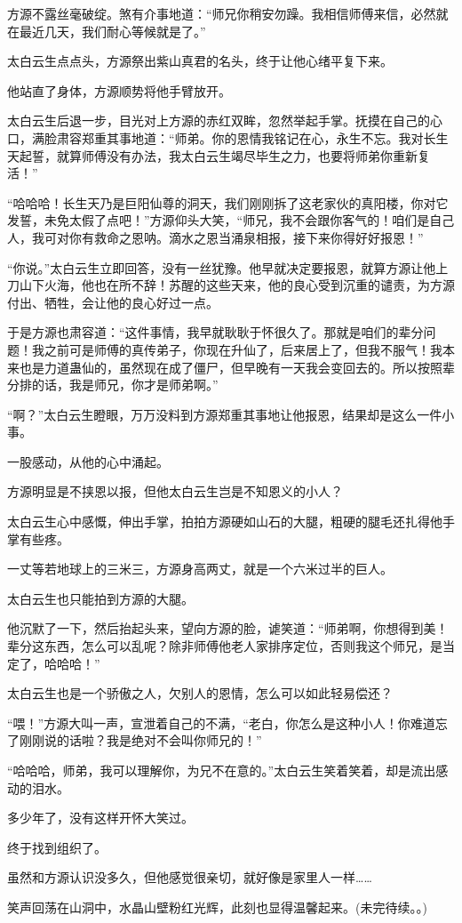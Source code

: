 \begin{this_body}
方源不露丝毫破绽。煞有介事地道：“师兄你稍安勿躁。我相信师傅来信，必然就在最近几天，我们耐心等候就是了。”

太白云生点点头，方源祭出紫山真君的名头，终于让他心绪平复下来。

他站直了身体，方源顺势将他手臂放开。

太白云生后退一步，目光对上方源的赤红双眸，忽然举起手掌。抚摸在自己的心口，满脸肃容郑重其事地道：“师弟。你的恩情我铭记在心，永生不忘。我对长生天起誓，就算师傅没有办法，我太白云生竭尽毕生之力，也要将师弟你重新复活！”

“哈哈哈！长生天乃是巨阳仙尊的洞天，我们刚刚拆了这老家伙的真阳楼，你对它发誓，未免太假了点吧！”方源仰头大笑，“师兄，我不会跟你客气的！咱们是自己人，我可对你有救命之恩呐。滴水之恩当涌泉相报，接下来你得好好报恩！”

“你说。”太白云生立即回答，没有一丝犹豫。他早就决定要报恩，就算方源让他上刀山下火海，他也在所不辞！苏醒的这些天来，他的良心受到沉重的谴责，为方源付出、牺牲，会让他的良心好过一点。

于是方源也肃容道：“这件事情，我早就耿耿于怀很久了。那就是咱们的辈分问题！我之前可是师傅的真传弟子，你现在升仙了，后来居上了，但我不服气！我本来也是力道蛊仙的，虽然现在成了僵尸，但早晚有一天我会变回去的。所以按照辈分排的话，我是师兄，你才是师弟啊。”

“啊？”太白云生瞪眼，万万没料到方源郑重其事地让他报恩，结果却是这么一件小事。

一股感动，从他的心中涌起。

方源明显是不挟恩以报，但他太白云生岂是不知恩义的小人？

太白云生心中感慨，伸出手掌，拍拍方源硬如山石的大腿，粗硬的腿毛还扎得他手掌有些疼。

一丈等若地球上的三米三，方源身高两丈，就是一个六米过半的巨人。

太白云生也只能拍到方源的大腿。

他沉默了一下，然后抬起头来，望向方源的脸，谑笑道：“师弟啊，你想得到美！辈分这东西，怎么可以乱呢？除非师傅他老人家排序定位，否则我这个师兄，是当定了，哈哈哈！”

太白云生也是一个骄傲之人，欠别人的恩情，怎么可以如此轻易偿还？

“喂！”方源大叫一声，宣泄着自己的不满，“老白，你怎么是这种小人！你难道忘了刚刚说的话啦？我是绝对不会叫你师兄的！”

“哈哈哈，师弟，我可以理解你，为兄不在意的。”太白云生笑着笑着，却是流出感动的泪水。

多少年了，没有这样开怀大笑过。

终于找到组织了。

虽然和方源认识没多久，但他感觉很亲切，就好像是家里人一样……

笑声回荡在山洞中，水晶山壁粉红光辉，此刻也显得温馨起来。(未完待续。。)

\end{this_body}

